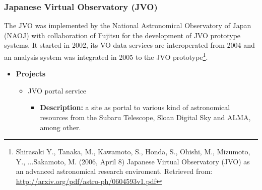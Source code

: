 \begin{comment}
\item \textbf{Description:}
\end{itemize}
\item VO Tools Worlwide
\begin{itemize}
\item \textbf{Description:}
\end{itemize}
\item LAMOST Online Collaboration Platform
\begin{itemize}
\item \textbf{Description:}
\end{itemize}
\item Chinese Astronomical Data Center 
\begin{itemize}
\item \textbf{Description:}
\end{itemize}
\item WWT Community Beijing
\begin{itemize}
\item \textbf{Description:}
\end{itemize}
\item Glossary of Astronomical Terms
\begin{itemize}
\item \textbf{Description:}
\end{itemize}
\end{itemize}
\end{itemize}
\end{comment}

\subsubsection{Japanese Virtual Observatory (JVO)}
The JVO \cite{website:jvo-home} \nocite{IshiharaMizumotoOhishiKawaray2004} was
implemented by the National Astronomical Observatory of Japan (NAOJ) with
collaboration of Fujitsu for the development of JVO prototype systems. It
started in 2002, its VO data services are interoperated from 2004 and an
analysis system was integrated in 2005 to the JVO prototype\footnote{Shirasaki
Y., Tanaka, M., Kawamoto, S., Honda, S., Ohishi, M., Mizumoto, Y., ...Sakamoto,
M. (2006, April 8) Japanese Virtual Observatory (JVO) as an advanced
astronomical research enviroment. Retrieved from:
\url{http://arxiv.org/pdf/astro-ph/0604593v1.pdf}}.

\begin{itemize}
\item \textbf{Projects}
\begin{itemize}
\item JVO portal service
\begin{itemize}
\item \textbf{Description:} a site as portal to various kind of astronomical
resources from the Subaru Telescope, Sloan Digital Sky and ALMA, among other.
\end{itemize}
\end{itemize}
\end{itemize}

